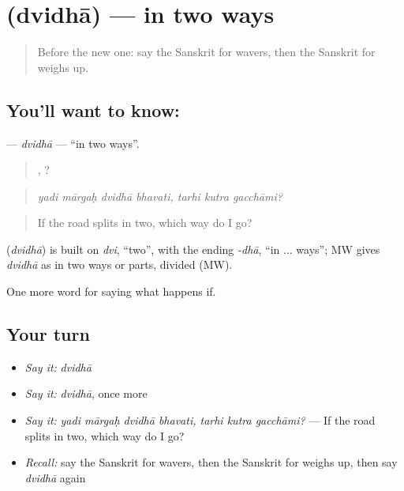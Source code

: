 \section[\texorpdfstring{\sk{द्विधा} (dvidhā)}{द्विधा (dvidhā)}]{ (dvidhā) — in two ways}

\label{lesson:SA-C541-dvidha}



\begin{quote}
Before the new one: say the Sanskrit for wavers, then the Sanskrit for weighs up.
\end{quote}

\subsection*{You'll want to know: }
\textbf{} — \emph{dvidhā} — \textquotedblleft{}in two ways\textquotedblright{}.

\begin{quote}
   ,   ?
\end{quote}

\begin{quote}
\emph{yadi mārgaḥ dvidhā bhavati, tarhi kutra gacchāmi?}
\end{quote}

\begin{quote}
If the road splits in two, which way do I go?
\end{quote}

\begin{cousinweb}
\textbf{} (\emph{dvidhā}) is built on \emph{dvi}, \textquotedblleft{}two\textquotedblright{}, with the ending \emph{-dhā}, \textquotedblleft{}in ... ways\textquotedblright{}; MW gives \emph{dvidhā} as in two ways or parts, divided (MW).
\end{cousinweb}

\begin{grammarlens}[title={What you've built}]
One more word for saying what happens if.
\end{grammarlens}

\subsection*{Your turn}
\begin{itemize}
\raggedright
  \item \emph{Say it:} \emph{dvidhā}
  \item \emph{Say it:} \emph{dvidhā}, once more
  \item \emph{Say it:} \emph{yadi mārgaḥ dvidhā bhavati, tarhi kutra gacchāmi?} — If the road splits in two, which way do I go?
  \item \emph{Recall:} say the Sanskrit for wavers, then the Sanskrit for weighs up, then say \emph{dvidhā} again
\end{itemize}

